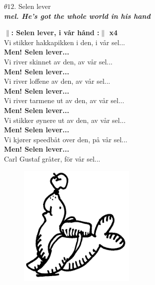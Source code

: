 \documentclass[a6paper,10pt]{article}
\newcommand{\mel}[1]{\small\textbf{\textit{mel. #1 \\}}}
\begin{document}
\setlength{\oddsidemargin}{-0.47in}
\begin{center}
\Large $\theta12$. Selen lever \\
\mel{He's got the whole world in his hand}
\end{center}
\textbf{$\|$: Selen lever, i vår hånd :$\|$ x4}
\vspace{5pt}\\
Vi stikker hakkapikken i den, i vår sel...
\vspace{5pt}\\
\textbf{Men! Selen lever...}
\vspace{5pt}\\
Vi river skinnet av den, av vår sel...
\vspace{5pt}\\
\textbf{Men! Selen lever...}
\vspace{5pt}\\
Vi river loffene av den, av vår sel...
\vspace{5pt}\\
\textbf{Men! Selen lever...}
\vspace{5pt}\\
Vi river tarmene ut av den, av vår sel...
\vspace{5pt}\\
\textbf{Men! Selen lever...}
\vspace{5pt}\\
Vi stikker øynere ut av den, av vår sel...
\vspace{5pt}\\
\textbf{Men! Selen lever...}
\vspace{5pt}\\
Vi kjører speedbåt over den, på vår sel...
\vspace{5pt}\\
\textbf{Men! Selen lever...}
\vspace{5pt}\\
Carl Gustaf gråter, för vår sel... 
\begin{figure}[!h]
\hfill 
\includegraphics[width=0.5\textwidth]{seal.png}
\end{figure}
\end{document}
